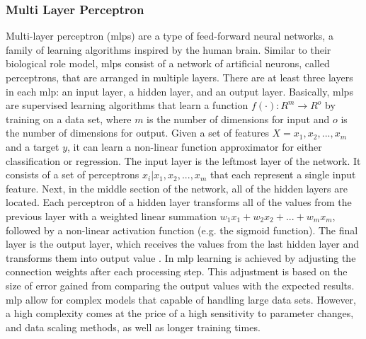 \subsubsection{Multi Layer Perceptron}
Multi-layer perceptron (\gls{mlp}s) are a type of feed-forward neural networks, a family of learning algorithms inspired by the human brain. Similar to their biological role model, \gls{mlp}s consist of a network of artificial neurons, called perceptrons, that are arranged in multiple layers. There are at least three layers in each \gls{mlp}: an input layer, a hidden layer, and an output layer.
Basically, \gls{mlp}s are supervised learning algorithms that learn a function $f(\cdot): R^m \longrightarrow R^o$ by training on a data set, where $m$ is the number of dimensions for input and $o$ is the number of dimensions for output. Given a set of features $X = x_{1},x_{2},...,x_{m}$ and a target $y$, it can learn a non-linear function approximator for either classification or regression.
The input layer is the leftmost layer of the network. It consists of a set of perceptrons ${x_{i}|x_{1},x_{2},...,x_{m}}$ that each represent a single input feature. Next, in the middle section of the network, all of the hidden layers are located. Each perceptron of a hidden layer transforms all of the values from the previous layer with a weighted linear summation $w_{1}x_{1} + w_{2}x_{2} + ... + w_{m}x_{m}$, followed by a non-linear activation function (e.g. the sigmoid function). The final layer is the output layer, which receives the values from the last hidden layer and transforms them into output value \cite{Pedregosa2011}. In \gls{mlp} learning is achieved by adjusting the connection weights after each processing step. This adjustment is based on the size of error gained from comparing the output values with the expected results. 
\gls{mlp} allow for complex models that capable of handling large data sets. However, a high complexity comes at the price of a high sensitivity to parameter changes, and data scaling methods, as well as longer training times. 

